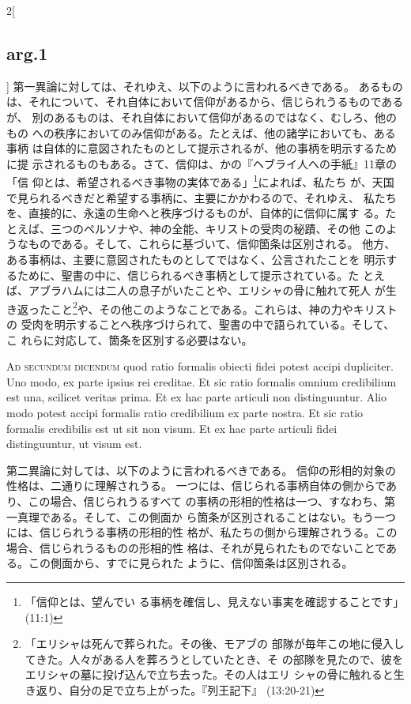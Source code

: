 \documentclass[paper=a4paper,fontsize=10pt,jafontsize=9pt,titlepage]{jlreq}
\begin{document}
\begin{paracol}{2}[\subsection{arg.1}]
第一異論に対しては、それゆえ、以下のように言われるべきである。
あるものは、それについて、それ自体において信仰があるから、信じられうるものであるが、
 別のあるものは、それ自体において信仰があるのではなく、むしろ、他のもの
 への秩序においてのみ信仰がある。たとえば、他の諸学においても、ある事柄
 は自体的に意図されたものとして提示されるが、他の事柄を明示するために提
 示されるものもある。さて、信仰は、かの『ヘブライ人への手紙』11章の「信
 仰とは、希望されるべき事物の実体である」\footnote{「信仰とは、望んでい
 る事柄を確信し、見えない事実を確認することです」(11:1)}によれば、私たち
 が、天国で見られるべきだと希望する事柄に、主要にかかわるので、それゆえ、
 私たちを、直接的に、永遠の生命へと秩序づけるものが、自体的に信仰に属す
 る。たとえば、三つのペルソナや、神の全能、キリストの受肉の秘蹟、その他
 このようなものである。そして、これらに基づいて、信仰箇条は区別される。
 他方、ある事柄は、主要に意図されたものとしてではなく、公言されたことを
 明示するために、聖書の中に、信じられるべき事柄として提示されている。た
 とえば、アブラハムには二人の息子がいたことや、エリシャの骨に触れて死人
 が生き返ったこと\footnote{「エリシャは死んで葬られた。その後、モアブの
 部隊が毎年この地に侵入してきた。人々がある人を葬ろうとしていたとき、そ
 の部隊を見たので、彼をエリシャの墓に投げ込んで立ち去った。その人はエリ
 シャの骨に触れると生き返り、自分の足で立ち上がった。『列王記下』
 (13:20-21)}や、その他このようなことである。これらは、神の力やキリストの
 受肉を明示することへ秩序づけられて、聖書の中で語られている。そして、こ
 れらに対応して、箇条を区別する必要はない。

\switchcolumn*[\subsection{ad.2}]

{\scshape Ad secundum dicendum} quod ratio formalis
obiecti fidei potest accipi dupliciter. Uno modo, ex parte ipsius rei
creditae. Et sic ratio formalis omnium credibilium est una, scilicet
veritas prima. Et ex hac parte articuli non distinguuntur. Alio modo
potest accipi formalis ratio credibilium ex parte nostra. Et sic ratio
formalis credibilis est ut sit non visum. Et ex hac parte articuli fidei
distinguuntur, ut visum est.

\switchcolumn

第二異論に対しては、以下のように言われるべきである。
信仰の形相的対象の性格は、二通りに理解されうる。
一つには、信じられる事柄自体の側からであり、この場合、信じられうるすべて
 の事柄の形相的性格は一つ、すなわち、第一真理である。そして、この側面か
 ら箇条が区別されることはない。もう一つには、信じられうる事柄の形相的性
 格が、私たちの側から理解されうる。この場合、信じられうるものの形相的性
 格は、それが見られたものでないことである。この側面から、すでに見られた
 ように、信仰箇条は区別される。


\end{paracol}
\end{document}
